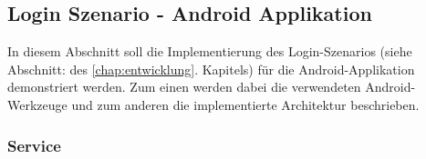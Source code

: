 \documentclass[Bachelorarbeit.tex]{subfiles}
\begin{document}
\subsection*{Login Szenario - Android Applikation}
\label{subsec:login_android}

In diesem Abschnitt soll die Implementierung des Login-Szenarios (siehe Abschnitt:  des \ref{chap:entwicklung}. Kapitels)  für die Android-Applikation demonstriert werden. 
Zum einen werden dabei die verwendeten Android-Werkzeuge und zum anderen die implementierte Architektur beschrieben. 

\subsubsection*{Service}
\label{subsub:android_service}
\end{document}
